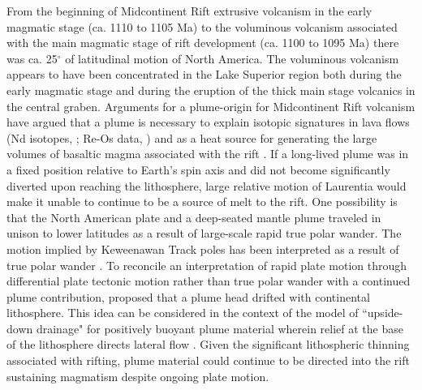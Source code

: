 \documentclass[draft,gc]{AGUTeX}
\begin{document}
\begin{article}
From the beginning of Midcontinent Rift extrusive volcanism in the early magmatic stage (ca. 1110 to 1105 Ma) to the voluminous volcanism associated with the main magmatic stage of rift development (ca. 1100 to 1095 Ma) there was ca. 25$^\circ$ of latitudinal motion of North America. The voluminous volcanism appears to have been concentrated in the Lake Superior region both during the early magmatic stage and during the eruption of the thick main stage volcanics in the central graben. Arguments for a plume-origin for Midcontinent Rift volcanism have argued that a plume is necessary to explain isotopic signatures in lava flows (Nd isotopes, \citet{Nicholson1997a}; Re-Os data, \citet{Shirey1997a}) and as a heat source for generating the large volumes of basaltic magma associated with the rift \citep{Cannon1992b}. If a long-lived plume was in a fixed position relative to Earth's spin axis and did not become significantly diverted upon reaching the lithosphere, large relative motion of Laurentia would make it unable to continue to be a source of melt to the rift. One possibility is that the North American plate and a deep-seated mantle plume traveled in unison to lower latitudes as a result of large-scale rapid true polar wander. The motion implied by Keweenawan Track poles has been interpreted as a result of true polar wander \citep{Evans2003b, Mitchell2012a}. To reconcile an interpretation of rapid plate motion through differential plate tectonic motion rather than true polar wander with a continued plume contribution, \citet{Davis1997a} proposed that a plume head drifted with continental lithosphere. This idea can be considered in the context of the model of ``upside-down drainage" for positively buoyant plume material wherein relief at the base of the lithosphere directs lateral flow \citep{Sleep1997a, Ebinger1998a}. Given the significant lithospheric thinning associated with rifting, plume material could continue to be directed into the rift sustaining magmatism despite ongoing plate motion.


\end{article}
\end{document}
